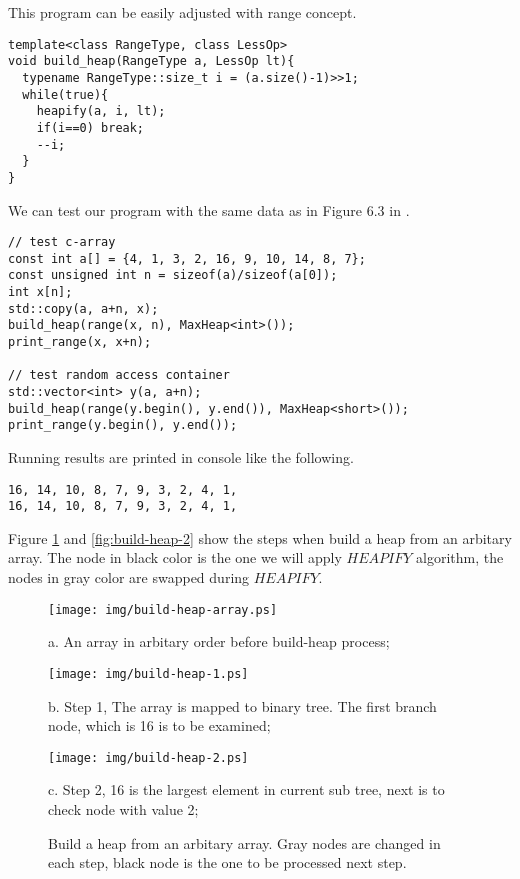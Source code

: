 \documentclass{article}
\begin{document}
This program can be easily adjusted with range concept.

\begin{lstlisting}
template<class RangeType, class LessOp>
void build_heap(RangeType a, LessOp lt){
  typename RangeType::size_t i = (a.size()-1)>>1;
  while(true){
    heapify(a, i, lt);
    if(i==0) break;
    --i;
  }
}
\end{lstlisting}

We can test our program with the same data as in Figure 6.3 in \cite{CLRS}.

\begin{lstlisting}
// test c-array
const int a[] = {4, 1, 3, 2, 16, 9, 10, 14, 8, 7};
const unsigned int n = sizeof(a)/sizeof(a[0]);
int x[n];
std::copy(a, a+n, x);
build_heap(range(x, n), MaxHeap<int>());
print_range(x, x+n);

// test random access container
std::vector<int> y(a, a+n);
build_heap(range(y.begin(), y.end()), MaxHeap<short>());
print_range(y.begin(), y.end());
\end{lstlisting}

Running results are printed in console like the following.

\begin{verbatim}
16, 14, 10, 8, 7, 9, 3, 2, 4, 1, 
16, 14, 10, 8, 7, 9, 3, 2, 4, 1,
\end{verbatim}

Figure \ref{fig:build-heap-1} and \ref{fig:build-heap-2} 
show the steps when build a heap from
an arbitary array. The node in black color is the one we will apply
$HEAPIFY$ algorithm, the nodes in gray color are swapped during
$HEAPIFY$.

\begin{figure}[htbp]
  \begin{center}
    \texttt{[image: img/build-heap-array.ps]}

    a. An array in arbitary order before build-heap process;

    \texttt{[image: img/build-heap-1.ps]}

    b. Step 1, The array is mapped to binary tree. The first branch node, which is
16 is to be examined;

    \texttt{[image: img/build-heap-2.ps]}

    c. Step 2, 16 is the largest element in current sub tree, next is to check node
with value 2;
    
    \caption{Build a heap from an arbitary array. Gray nodes are changed in each step,
black node is the one to be processed next step.} \label{fig:build-heap-1}
  \end{center}
\end{figure}
\end{document}
